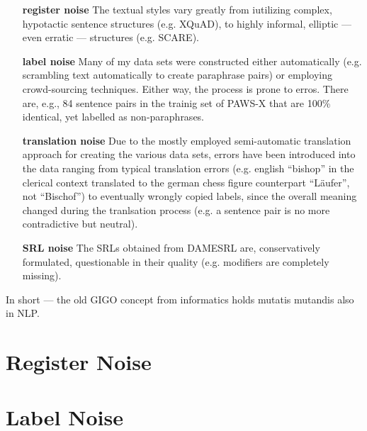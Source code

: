 \begin{itemize}
  \item[\textbf{register noise}] The textual styles vary greatly from iutilizing complex,
                                 hypotactic sentence structures (e.g. XQuAD), to highly
                                 informal, elliptic --- even erratic --- structures
                                 (e.g. SCARE).
 \item[\textbf{label noise}] Many of my data sets were constructed either automatically
                             (e.g. scrambling text automatically to create paraphrase pairs)
                             or employing crowd-sourcing techniques. Either way, the process
                             is prone to erros. There are, e.g., 84 sentence pairs in the trainig
                             set of PAWS-X that are 100\% identical, yet labelled as non-paraphrases.
 \item[\textbf{translation noise}] Due to the mostly employed semi-automatic translation
                                   approach for creating the various data sets, errors
                                   have been introduced into the data ranging from typical
                                   translation errors (e.g. english ``bishop'' in the clerical
                                   context translated to the german chess figure counterpart
                                   ``Läufer'', not ``Bischof'') to eventually wrongly copied
                                   labels, since the overall meaning changed during
                                   the tranlsation process (e.g. a sentence pair is no more
                                   contradictive but neutral).
 \item[\textbf{SRL noise}] The SRLs obtained from DAMESRL are, conservatively formulated,
                           questionable in their quality (e.g. modifiers are completely missing).
\end{itemize}

In short --- the old GIGO concept from informatics holds mutatis mutandis also in NLP.

\section{Register Noise}
\label{sec:register-noise}

\section{Label Noise}
\label{sec:label-noise}

